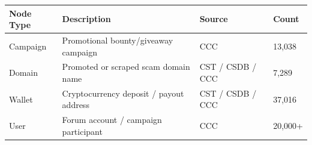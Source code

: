 \begin{tabular}{llll}
\toprule
Node Type & Description & Source & Count \\
\midrule
Campaign & Promotional bounty/giveaway campaign & CCC & 13,038 \\
Domain & Promoted or scraped scam domain name & CST / CSDB / CCC & 7,289 \\
Wallet & Cryptocurrency deposit / payout address & CST / CSDB / CCC & 37,016 \\
User & Forum account / campaign participant & CCC & 20,000+ \\
\bottomrule
\end{tabular}
